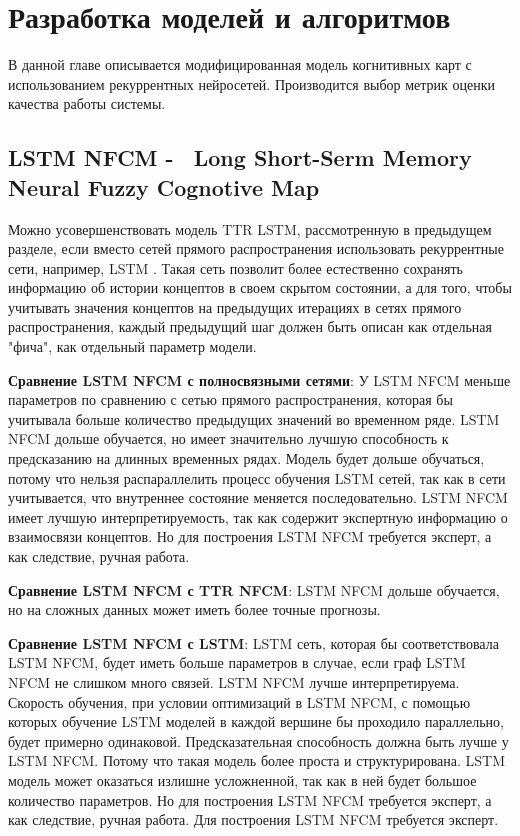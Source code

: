 \chapter{Разработка моделей и алгоритмов}

\begin{annotation}
	В данной главе описывается модифицированная модель
	когнитивных карт с использованием рекуррентных нейросетей.
	Производится выбор метрик оценки качества работы системы.
\end{annotation}

\section{LSTM NFCM -~ Long Short-Serm Memory Neural Fuzzy Cognotive Map}

Можно усовершенствовать модель TTR LSTM, рассмотренную в предыдущем разделе,
если вместо сетей прямого распространения использовать рекуррентные сети,
например, LSTM \cite{LSTM_paper}. Такая сеть позволит более естественно
сохранять информацию об истории концептов в своем скрытом состоянии,
а для того, чтобы учитывать значения концептов на предыдущих итерациях
в сетях прямого распространения, каждый предыдущий шаг должен быть
описан как отдельная "фича", как отдельный параметр модели.

\textbf{Сравнение LSTM NFCM с полносвязными сетями}:
У LSTM NFCM меньше параметров по сравнению с сетью прямого распространения,
которая бы учитывала больше количество предыдущих значений во временном ряде.
LSTM NFCM дольше обучается, но имеет значительно лучшую способность к предсказанию
на длинных временных рядах.
Модель будет дольше обучаться, потому что нельзя распараллелить
процесс обучения LSTM сетей, так как в сети учитывается, что внутреннее состояние меняется последовательно.
LSTM NFCM имеет лучшую интерпретируемость, так как содержит
экспертную информацию о взаимосвязи концептов.
Но для построения LSTM NFCM требуется эксперт, а как следствие,
ручная работа.

\textbf{Сравнение LSTM NFCM с TTR NFCM}:
LSTM NFCM дольше обучается, но на сложных данных
может иметь более точные прогнозы.

\textbf{Сравнение LSTM NFCM с LSTM}:
LSTM сеть, которая бы соответствовала LSTM NFCM, будет иметь
больше параметров в случае, если граф LSTM NFCM не слишком
много связей. LSTM NFCM лучше интерпретируема.
Скорость обучения, при условии оптимизаций в LSTM NFCM, с
помощью которых обучение LSTM моделей в каждой вершине бы проходило
параллельно, будет примерно одинаковой.
Предсказательная способность должна быть лучше у LSTM NFCM.
Потому что такая модель более проста и структурирована.
LSTM модель может оказаться излишне усложненной, так как в ней будет
большое количество параметров.
Но для построения LSTM NFCM требуется эксперт, а как следствие,
ручная работа.
Для построения LSTM NFCM требуется эксперт.

